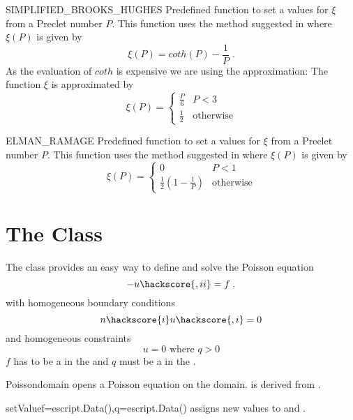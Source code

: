 \begin{memberdesc}[AdvectivePDE]{SIMPLIFIED_BROOKS_HUGHES}{}
Predefined function to set a values for $\xi$ from a Preclet number $P$. 
This function uses the method suggested in 
where $\xi(P)$ is given by 
\begin{equation}\label{LINEARPDE.ADVECTIVE.1d}
\xi(P)=coth(P)-\frac{1}{P} \;.
\end{equation}
As the evaluation of $coth$ is expensive we are using the approximation:
The function $\xi$ is approximated by
\begin{equation}\label{LINEARPDE.ADVECTIVE.23}
\xi(P)=
\left\{ 
\begin{array}{lc}
\frac{P}{6} & P<3 \\
\frac{1}{2} & \mbox{otherwise}
\end{array}
\right.
\end{equation}
\end{memberdesc}

\begin{memberdesc}[AdvectivePDE]{ELMAN_RAMAGE}{}
Predefined function to set a values for $\xi$ from a Preclet number $P$. 
This function uses the method suggested in 
where $\xi(P)$ is given by 
\begin{equation}\label{LINEARPDE.ADVECTIVE.23b}
\xi(P)=
\left\{ 
\begin{array}{lc}
0  & P<1 \\
\frac{1}{2}(1-\frac{1}{P}) & \mbox{otherwise}
\end{array}
\right.
\end{equation}
\end{memberdesc}


\section{The \Poisson Class}

The \Poisson class provides an easy way to define and solve the Poisson
equation
\begin{equation}\label{POISSON.1}
-u\hackscore{,ii}=f\; .
\end{equation}
with homogeneous boundary conditions
\begin{equation}\label{POISSON.2}
n\hackscore{i}u\hackscore{,i}=0
\end{equation}
and homogeneous constraints
\begin{equation}\label{POISSON.3}
u=0 \mbox{ where } q>0
\end{equation}
$f$ has to be a \Scalar in the \Function and $q$ must be
a \Scalar in  the \SolutionFS. 

\begin{classdesc}{Poisson}{domain}
opens a Poisson equation on the \Domain domain. \Poisson is derived from \LinearPDE.
\end{classdesc}
\begin{methoddesc}[Poisson]{setValue}{f=escript.Data(),q=escript.Data()}
assigns new values to  and .
\end{methoddesc}
